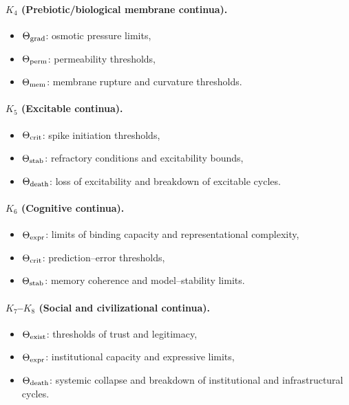 \paragraph{\texorpdfstring{\(K_4\)}{K_4} (Prebiotic/biological membrane continua).}
\begin{itemize}
    \item \(\Theta_{\rm grad}\): osmotic pressure limits,
    \item \(\Theta_{\rm perm}\): permeability thresholds,
    \item \(\Theta_{\rm mem}\): membrane rupture and curvature thresholds.
\end{itemize}

\paragraph{\texorpdfstring{\(K_5\)}{K_5} (Excitable continua).}
\begin{itemize}
    \item \(\Theta_{\rm crit}\): spike initiation thresholds,
    \item \(\Theta_{\rm stab}\): refractory conditions and excitability bounds,
    \item \(\Theta_{\rm death}\): loss of excitability and breakdown of
          excitable cycles.
\end{itemize}

\paragraph{\texorpdfstring{\(K_6\)}{K_6} (Cognitive continua).}
\begin{itemize}
    \item \(\Theta_{\rm expr}\): limits of binding capacity and representational
          complexity,
    \item \(\Theta_{\rm crit}\): prediction–error thresholds,
    \item \(\Theta_{\rm stab}\): memory coherence and model–stability limits.
\end{itemize}

\paragraph{\texorpdfstring{\(K_7\)}{K_7}–\texorpdfstring{\(K_8\)}{K_8} (Social and civilizational continua).}
\begin{itemize}
    \item \(\Theta_{\rm exist}\): thresholds of trust and legitimacy,
    \item \(\Theta_{\rm expr}\): institutional capacity and expressive limits,
    \item \(\Theta_{\rm death}\): systemic collapse and breakdown of
          institutional and infrastructural cycles.
\end{itemize}


